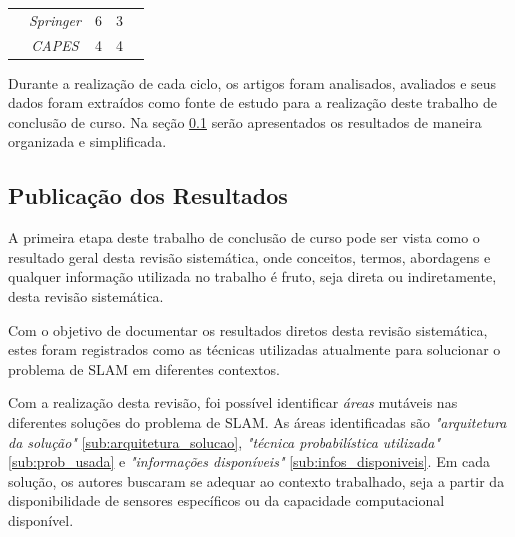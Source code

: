 \begin{table}[H]
\begin{tabular}{|c|c|c|c|c|}
                                 & \textit{Springer}                                                                   & 6                & 3                     &                                                                                                                                                                                              \\ \cline{2-4}
                                 & \textit{CAPES}                                                                      & 4                & 4                     &                                                                                                                                                                                              \\ \hline
\end{tabular}
\end{table}

Durante a realização de cada ciclo, os artigos foram analisados, avaliados e seus dados foram extraídos como fonte de estudo para a realização deste trabalho de conclusão de curso. Na seção \ref{sub:publicacaoRevisao} serão apresentados os resultados de maneira organizada e simplificada.


	\subsection{Publicação dos Resultados} %
	\label{sub:publicacaoRevisao}
		
		A primeira etapa deste trabalho de conclusão de curso pode ser vista como o resultado geral desta revisão sistemática, onde conceitos, termos, abordagens e qualquer informação utilizada no trabalho é fruto, seja direta ou indiretamente, desta revisão sistemática.

		Com o objetivo de documentar os resultados diretos desta revisão sistemática, estes foram registrados como as técnicas utilizadas atualmente para solucionar o problema de SLAM em diferentes contextos. 

		Com a realização desta revisão, foi possível identificar \textit{áreas} mutáveis nas diferentes soluções do problema de SLAM. As áreas identificadas são \textit{"arquitetura da solução"} \ref{sub:arquitetura_solucao}, \textit{"técnica probabilística utilizada"} \ref{sub:prob_usada} e \textit{"informações disponíveis"} \ref{sub:infos_disponiveis}. Em cada solução, os autores buscaram se adequar ao contexto trabalhado, seja a partir da disponibilidade de sensores específicos ou da capacidade computacional disponível.

